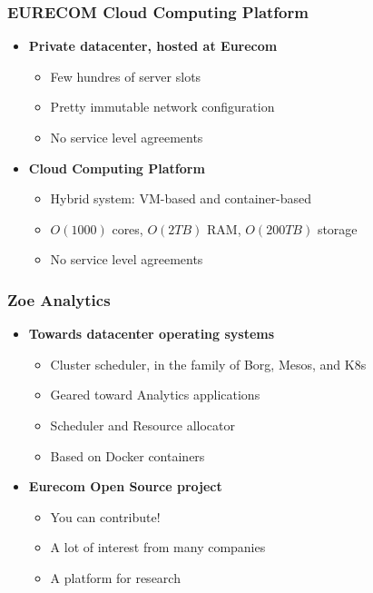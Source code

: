 \begin{frame}\frametitle{EURECOM Cloud Computing Platform}
\begin{itemize}
	\item {\bf Private datacenter, hosted at Eurecom}
	\begin{itemize}
		\item Few hundres of server slots
		\item Pretty immutable network configuration
		\item No service level agreements
	\end{itemize}

	\item {\bf Cloud Computing Platform}
	\begin{itemize}
		\item Hybrid system: VM-based and container-based
		\item $O(1000)$ cores, $O(2 TB)$ RAM, $O(200 TB)$ storage
		\item No service level agreements
	\end{itemize}
\end{itemize}
\end{frame}

\begin{frame}\frametitle{Zoe Analytics}
\begin{itemize}
	\item {\bf Towards datacenter operating systems}
	\begin{itemize}
		\item Cluster scheduler, in the family of Borg, Mesos, and K8s
		\item Geared toward Analytics applications
		\item Scheduler and Resource allocator
		\item Based on Docker containers
	\end{itemize}

	\item {\bf Eurecom Open Source project}
	\begin{itemize}
		\item You can contribute!
		\item A lot of interest from many companies
		\item A platform for research
	\end{itemize}
\end{itemize}
\end{frame}

